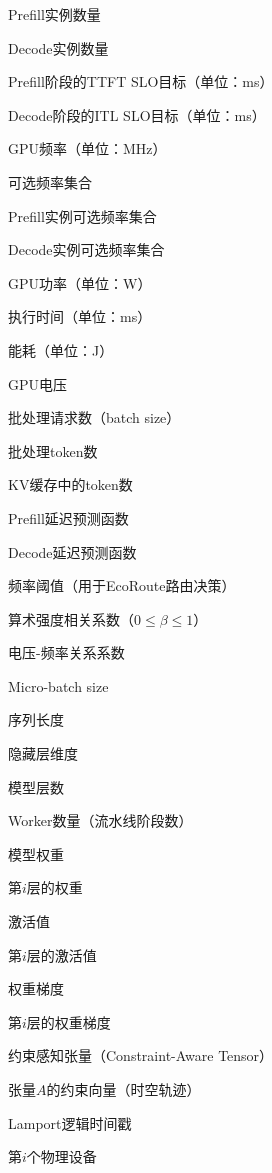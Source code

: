 \begin{denotation}[3.5cm]
  \item[$N_P$] Prefill实例数量
  \item[$N_D$] Decode实例数量
  \item[$S_P$] Prefill阶段的TTFT SLO目标（单位：ms）
  \item[$S_D$] Decode阶段的ITL SLO目标（单位：ms）
  \item[$f$] GPU频率（单位：MHz）
  \item[$\mathcal{F}$] 可选频率集合
  \item[$\mathcal{F}_P$] Prefill实例可选频率集合
  \item[$\mathcal{F}_D$] Decode实例可选频率集合
  \item[$P$] GPU功率（单位：W）
  \item[$T$] 执行时间（单位：ms）
  \item[$E$] 能耗（单位：J）
  \item[$V$] GPU电压
  \item[$N_{\text{req}}$] 批处理请求数（batch size）
  \item[$N_{\text{tok}}$] 批处理token数
  \item[$N_{\text{kv}}$] KV缓存中的token数
  \item[$T_P(\cdot)$] Prefill延迟预测函数
  \item[$T_D(\cdot)$] Decode延迟预测函数
  \item[$\Delta$] 频率阈值（用于EcoRoute路由决策）
  \item[$\beta$] 算术强度相关系数（$0\le\beta\le1$）
  \item[$\alpha$] 电压-频率关系系数

  \item[$G$] Micro-batch size
  \item[$S$] 序列长度
  \item[$H$] 隐藏层维度
  \item[$L$] 模型层数
  \item[$P$] Worker数量（流水线阶段数）
  \item[$W$] 模型权重
  \item[$W_i$] 第$i$层的权重
  \item[$A$] 激活值
  \item[$A_i$] 第$i$层的激活值
  \item[$D$] 权重梯度
  \item[$D_i$] 第$i$层的权重梯度

  \item[CAT] 约束感知张量（Constraint-Aware Tensor）
  \item[$C_A$] 张量$A$的约束向量（时空轨迹）
  \item[$t$] Lamport逻辑时间戳
  \item[$\text{Device}_i$] 第$i$个物理设备
\end{denotation}
